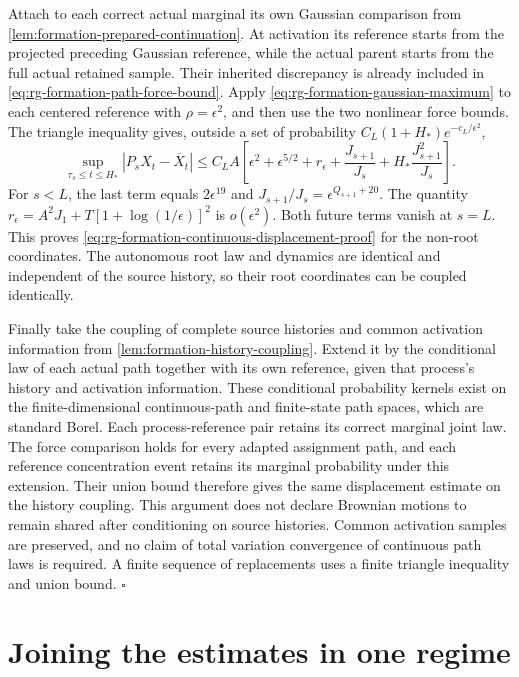 Attach to each correct actual marginal its own Gaussian comparison
from \cref{lem:formation-prepared-continuation}. At activation its
reference starts from the projected preceding Gaussian reference,
while the actual parent starts from the full actual retained
sample. Their inherited discrepancy is already included in
\cref{eq:rg-formation-path-force-bound}. Apply
\cref{eq:rg-formation-gaussian-maximum} to each centered reference
with $\rho=\epsilon^2$, and then use the two nonlinear force
bounds. The triangle inequality gives, outside a set of probability
$C_L(1+H_*)e^{-c_L/\epsilon^2}$,
\begin{equation}
 \sup_{\tau_s\le t\le H_*}|P_sX_t-\overline X_t|
 \le C_LA\left[
 \epsilon^2+\epsilon^{5/2}+r_\epsilon
 +\frac{J_{s+1}}{J_s}
 +H_*\frac{J_{s+1}^2}{J_s}\right].
 \label{eq:rg-formation-continuous-error-terms}
\end{equation}
For $s<L$, the last term equals $2\epsilon^{19}$ and
$J_{s+1}/J_s=\epsilon^{Q_{s+1}+20}$. The quantity
$r_\epsilon=A^2J_1+T[1+\log(1/\epsilon)]^2$ is $o(\epsilon^2)$.
Both future terms vanish at $s=L$. This proves
\cref{eq:rg-formation-continuous-displacement-proof} for the
non-root coordinates. The autonomous root law and dynamics are
identical and independent of the source history, so their root
coordinates can be coupled identically.

Finally take the coupling of complete source histories and common
activation information from \cref{lem:formation-history-coupling}.
Extend it by the conditional law of each actual path together with
its own reference, given that process's history and activation
information. These conditional probability kernels exist on the
finite-dimensional continuous-path and finite-state path spaces,
which are standard Borel. Each process-reference pair retains its
correct marginal joint law. The force comparison holds for every
adapted assignment path, and each reference concentration event
retains its marginal probability under this extension. Their union
bound therefore gives the same displacement estimate on the
history coupling. This argument does not declare Brownian motions
to remain shared after conditioning on source histories. Common
activation samples are preserved, and no claim of total variation
convergence of continuous path laws is required. A finite sequence
of replacements uses a finite triangle inequality and union bound.
\hfill$\square$

\section{Joining the estimates in one regime}
\label{sec:rg-formation-common-regime-proof}

